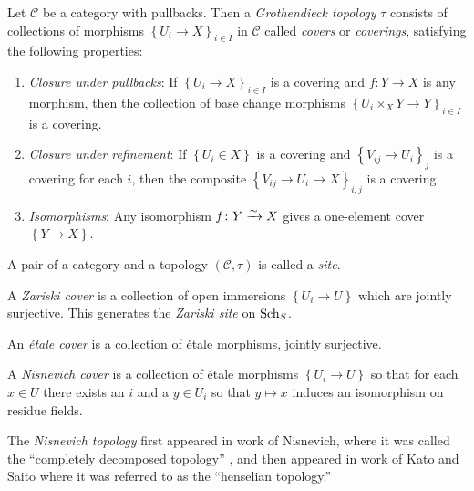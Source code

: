 \documentclass[11pt,openany]{book}
\begin{document}
\begin{definition} Let $\mathscr{C}$ be a category with pullbacks. Then a \textit{Grothendieck topology} $\tau$ consists of collections of morphisms $\left\{ U_i \to X \right\}_{i\in I}$ in $\mathscr{C}$ called \textit{covers} or \textit{coverings}, satisfying the following properties:
\begin{enumerate}
    \item \textit{Closure under pullbacks}: If $\left\{ U_i \to X \right\}_{i\in I}$ is a covering and $f \colon Y \to X$ is any morphism, then the collection of base change morphisms $\left\{ U_i \times_X Y \to Y \right\}_{i\in I}$ is a covering.
    \item \textit{Closure under refinement}: If $\left\{ U_i \in X \right\}$ is a covering and $\left\{ V_{ij} \to U_i \right\}_j$ is a covering for each $i$, then the composite $\left\{ V_{ij} \to U_i \to X \right\}_{i,j}$ is a covering
    \item \textit{Isomorphisms}: Any isomorphism $f\colon Y \xrightarrow{\sim} X$ gives a one-element cover $\left\{ Y \to X \right\}$.
\end{enumerate}
A pair of a category and a topology $(\mathscr{C},\tau)$ is called a \textit{site}.
\end{definition}

\begin{example} A \textit{Zariski cover} is a collection of open immersions $\left\{ U_i \to U \right\}$ which are jointly surjective. This generates the \textit{Zariski site} on $\mathrm{Sch}_S$.
\end{example}

\begin{example} An \textit{\'etale cover} is a collection of \'etale morphisms, jointly surjective.
\end{example}

\begin{example} A \textit{Nisnevich cover} is a collection of \'etale morphisms $\left\{ U_i \to U \right\}$ so that for each $x\in U$ there exists an $i$ and a $y\in U_i$ so that $y\mapsto x$ induces an isomorphism on residue fields.
\end{example}

\begin{remark} The \textit{Nisnevich topology} first appeared in work of Nisnevich, where it was called the ``completely decomposed topology'' \cite{Nis80}, and then appeared in work of Kato and Saito \cite{KS-Global} where it was referred to as the ``henselian topology.''
\end{remark}
\end{document}
